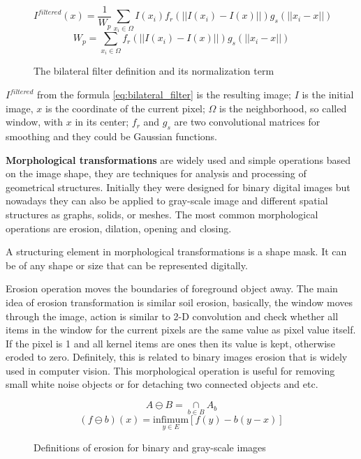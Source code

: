 \documentclass[../../../../main]{subfiles}
\begin{document}
\begin{figure} [!ht]
  \centering    
    \begin{equation}
    \label{eq:bilateral_filter}
        I^{filtered}(x)=\frac{1}{W_p}\sum_{x_i\in\Omega} I(x_i)f_r(||I(x_i)-I(x)||)g_s(||x_i-x||)
    \end{equation}
    \begin{equation}
       W_p=\sum_{x_i\in\Omega} f_r(||I(x_i)-I(x)||)g_s(||x_i-x||)
    \end{equation}
  \caption{The bilateral filter definition and its normalization term}
\end{figure}

$I^{filtered}$ from the formula \ref{eq:bilateral_filter} is the resulting image; $I$ is the initial image, $x$ is the coordinate of the current pixel; $\Omega$ is the neighborhood, so called window, with $x$ in its center; $f_r$ and $g_s$ are two convolutional matrices for smoothing and they could be Gaussian functions.

\textbf{Morphological transformations} are widely used and simple operations based on the image shape, they are techniques for analysis and processing of geometrical structures. Initially they were designed for binary digital images but nowadays they can also be applied to gray-scale image and different spatial structures as graphs, solids, or meshes. The most common morphological operations are erosion, dilation, opening and closing.

A structuring element in morphological transformations is a shape mask. It can be of any shape or size that can be represented digitally.

Erosion operation moves the boundaries of foreground object away. The main idea of erosion transformation is similar soil erosion, basically, the window moves through the image, action is similar to 2-D convolution and check whether all items in the window for the current pixels are the same value as pixel value itself. If the pixel is 1 and all kernel items are ones then its value is kept, otherwise eroded to zero. Definitely, this is related to binary images erosion that is widely used in computer vision. This morphological operation is useful for removing small white noise objects or for detaching two connected objects and etc.

\begin{figure} [!ht]
  \centering    
    \begin{equation}
        A \ominus B = \underset{b\in B}{\cap} A_b
    \end{equation}
    \begin{equation}
       (f \ominus b)(x) = \underset{y\in E}{\text{infimum}}[f(y)-b(y-x)]
    \end{equation}
  \caption{Definitions of erosion for binary and gray-scale images}
\end{figure}
\end{document}
